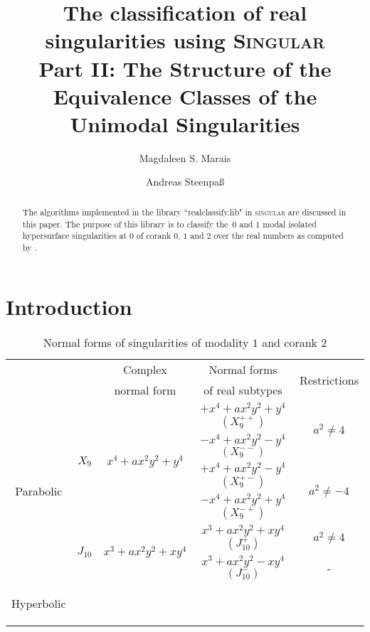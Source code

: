 \documentclass[noend]{amsproc}
\title[The classification of real singularities using \textsc{Singular}, %
Part II]%
{The classification of real singularities using \textsc{Singular}\\
Part II: The Structure of the Equivalence Classes of the Unimodal %
Singularities}
\author{Magdaleen S. Marais}
\author{Andreas Steenpa\ss}
\theoremstyle{definition}
\begin{document}
\begin{abstract}
The algorithms implemented in the library ``realclassify.lib" in
\textsc{singular} are discussed in this paper. The purpose of this library is
to classify the~$0$ and $1$ modal isolated hypersurface singularities at $0$ of
corank $0$, $1$ and $2$ over the real numbers as computed by \citet{AVG1985}.
\end{abstract}
\maketitle


\section{Introduction}

\begin{table}[tp]
\centering
\caption{Normal forms of singularities of modality $1$ and corank $2$}
\label{tab:normal_forms}
\begin{tabular}{|c|c|c|c|c|}
\hline

\multicolumn{1}{|c}{}
 & & Complex     & Normal forms     & \multirow{2}{*}{Restrictions} \\
\multicolumn{1}{|c}{}
 & & normal form & of real subtypes &                               \\
\hline\hline


\multirow{6}{*}{\begin{sideways}Parabolic\end{sideways}}

& \multirow{4}{*}{$X_9$} & \multirow{4}{*}{$x^4+ax^2y^2+y^4$}
  & $+x^4+ax^2y^2+y^4$ $(X_9^{++})$ & \multirow{2}{*}{$a^2\neq4$} \\\cline{4-4}
&&& $-x^4+ax^2y^2-y^4$ $(X_9^{--})$ &                             \\\cline{4-5}
&&& $+x^4+ax^2y^2-y^4$ $(X_9^{+-})$ & \multirow{2}{*}{$a^2\neq-4$}\\\cline{4-4}
&&& $-x^4+ax^2y^2+y^4$ $(X_9^{-+})$ &                             \\\cline{2-5}

& \multirow{2}{*}{$J_{10}$} & \multirow{2}{*}{$x^3+ax^2y^2+xy^4$}
  & $x^3+ax^2y^2+xy^4$ $(J_{10}^+)$ & $a^2 \neq 4$ \\ \cline{4-5}
&&& $x^3+ax^2y^2-xy^4$ $(J_{10}^-)$ & -            \\ \hline


\multirow{12}{*}{\begin{sideways}Hyperbolic\end{sideways}}


\end{tabular}
\end{table}
\end{document}
